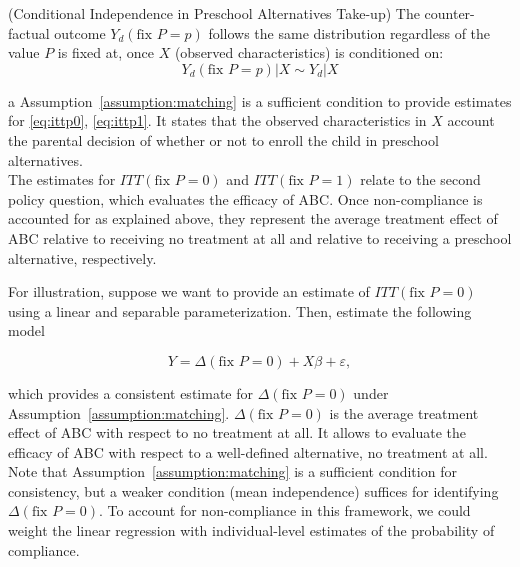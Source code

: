 \begin{assumption} \normalfont (Conditional Independence in Preschool Alternatives Take-up) The counter-factual outcome $Y_{d} \left( \text{fix } P=p \right)$ follows the same distribution regardless of the value $P$ is fixed at, once $X$ (observed characteristics) is conditioned on: 
\begin{equation}
Y_{d} \left( \text{fix } P=p \right) | X \sim Y_{d}  | X 
\end{equation}
 \end{assumption}
a
\noindent Assumption~\ref{assumption:matching} is a sufficient condition to provide estimates for \eqref{eq:ittp0}, \eqref{eq:ittp1}.  It states that the observed characteristics in $X$ account the parental decision of whether or not to enroll the child in preschool alternatives.\\

\noindent The estimates for $ITT \left( \text{fix } P = 0 \right) $ and $ITT \left( \text{fix } P = 1 \right)$ relate to the second policy question, which evaluates the efficacy of ABC. Once non-compliance is accounted for as explained above, they represent the average treatment effect of ABC relative to receiving no treatment at all and relative to receiving a preschool alternative, respectively.

\noindent For illustration, suppose we want to provide an estimate of $ITT \left( \text{fix } P = 0 \right)$ using a linear and separable parameterization. Then, estimate the following model 

\begin{equation}
Y = \Delta \left( \text{fix } P = 0 \right) + X \beta + \varepsilon, 
\end{equation}

\noindent which provides a consistent estimate for $\Delta \left( \text{fix } P = 0 \right)$ under Assumption~\ref{assumption:matching}. $\Delta \left( \text{fix } P = 0 \right)$ is the average treatment effect of ABC with respect to no treatment at all. It allows to evaluate the efficacy of ABC with respect to a well-defined alternative, no treatment at all. Note that Assumption~\ref{assumption:matching} is a sufficient condition for consistency, but a weaker condition (mean independence) suffices for identifying $\Delta \left( \text{fix } P = 0 \right)$. To account for non-compliance in this framework, we could weight the linear regression with individual-level estimates of the probability of compliance.\\

